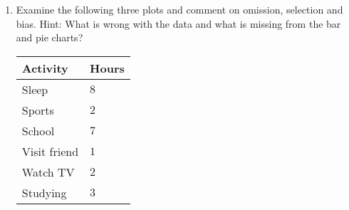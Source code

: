 {\begin{enumerate}
\item Examine the following three plots and comment on omission, selection and bias. Hint: What is wrong with the data and what is missing from the bar and pie charts?

\begin{center}
\begin{tabular}{|l|l|}
\hline
Activity & Hours \\ 
\hline
Sleep        & $8 $\\
Sports       & $2 $\\
School       & $7 $\\
Visit friend & $1$ \\
Watch TV     & $2$ \\
Studying     & $3$ \\
\hline
\end{tabular}
\end{center}


\end{enumerate}}
